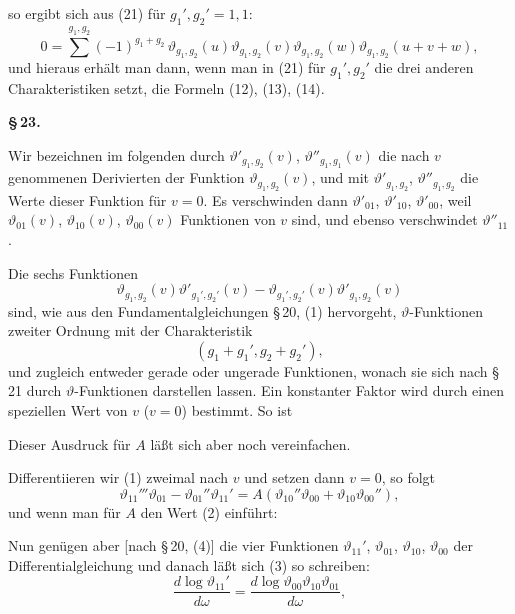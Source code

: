 so ergibt sich aus (21) für $g_1', g_2' = 1,1$:
\[
0 = \sum\limits^{g_1,g_2} (-1)^{g_1+g_2}\,\vartheta_{g_1,g_2}(u)\vartheta_{g_1,g_2}(v)\vartheta_{g_1,g_2}(w)\vartheta_{g_1,g_2}(u+v+w),
\]
und hieraus erhält man dann, wenn man in (21) für $g_1', g_2'$ die drei anderen Charakteristiken setzt, die Formeln (12), (13), (14).

\begin{center}
\textbf{\S\,23. }
\end{center}

Wir bezeichnen im folgenden durch $\vartheta'_{g_1,g_2}(v)$, $\vartheta''_{g_1,g_1}(v)$ %
die nach $v$ genommenen Derivierten der Funktion $\vartheta_{g_1,g_2}(v)$, und mit $\vartheta'_{g_1,g_2}$, $\vartheta''_{g_1,g_2}$ die Werte dieser Funktion für $v=0$. Es verschwinden dann $\vartheta'_{01}$, $\vartheta'_{10}$, $\vartheta'_{00}$, weil $\vartheta_{01}(v)$, $\vartheta_{10}(v)$, $\vartheta_{00}(v)$  Funktionen von $v$ sind, und ebenso verschwindet $\vartheta''_{11}$.

Die sechs Funktionen
\[
\vartheta_{g_1,g_2}(v)\vartheta'_{g_1',g_2'}(v) - \vartheta_{g_1',g_2'}(v)\vartheta'_{g_1,g_2}(v)
\]
sind, wie aus den Fundamentalgleichungen \S\,20, (1) hervorgeht, $\vartheta$-Funktionen zweiter Ordnung mit der Charakteristik
\[
(g_1+g_1', g_2+g_2'),
\]
und zugleich entweder gerade oder ungerade Funktionen, wonach sie sich nach \S\,21 durch $\vartheta$-Funktionen darstellen lassen. Ein konstanter Faktor wird durch einen speziellen Wert von $v$ ($v=0$) bestimmt. So ist

Dieser Ausdruck für $A$ läßt sich aber noch vereinfachen.

Differentiieren wir (1) zweimal nach $v$ und setzen dann $v=0$, so folgt
\[
\vartheta_{11}'''\vartheta_{01} - \vartheta_{01}''\vartheta_{11}' = A(\vartheta_{10}''\vartheta_{00} + \vartheta_{10}\vartheta_{00}''),
\]
und wenn man für $A$ den Wert (2) einführt:

Nun genügen aber [nach \S\,20, (4)] die vier Funktionen $\vartheta_{11}'$, $\vartheta_{01}$, $\vartheta_{10}$, $\vartheta_{00}$ der Differentialgleichung
und danach läßt sich (3) so schreiben:
\[
\frac{d\log \vartheta_{11}'}{d\omega} = \frac{d\log \vartheta_{00}\vartheta_{10}\vartheta_{01}}{d\omega},
\]
